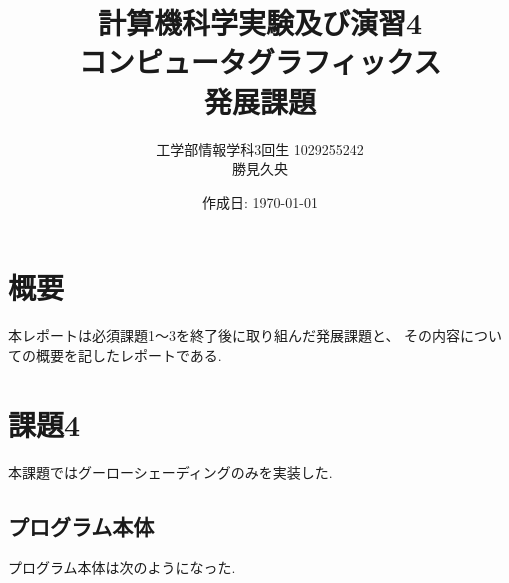 \documentclass[a4j,dvipdfmx]{jsarticle}
\begin{document}
\title{計算機科学実験及び演習4\\コンピュータグラフィックス\\発展課題}
\author{工学部情報学科3回生 1029255242\\勝見久央}
\date{作成日: \today} %
\maketitle
\section{概要}
本レポートは必須課題1〜3を終了後に取り組んだ発展課題と、
その内容についての概要を記したレポートである.

\section{課題4}
本課題ではグーローシェーディングのみを実装した.
\subsection{プログラム本体}
プログラム本体は次のようになった.

\end{document}
